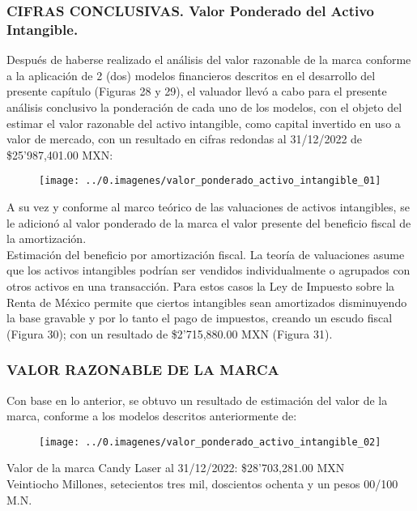 \begin{rightcolumn}

\subsubsection{CIFRAS CONCLUSIVAS. Valor Ponderado del Activo Intangible.}

 Después de haberse realizado el análisis del valor razonable de la marca conforme a la aplicación de 2 (dos) modelos financieros descritos en el desarrollo del presente capítulo (Figuras 28 y 29), el valuador llevó a cabo para el presente análisis conclusivo la ponderación de cada uno de los modelos,  con el objeto del estimar el valor razonable del activo intangible, como capital invertido en uso a valor de mercado,  con un resultado en cifras redondas al 31/12/2022 de \$25'987,401.00 MXN:\\
 
 \begin{figure}[H]
 	\centering
	\texttt{[image: ../0.imagenes/valor\_ponderado\_activo\_intangible\_01]}
 \end{figure}
 
 A su vez y conforme al marco teórico de las valuaciones de activos intangibles, se le adicionó al valor ponderado de la marca el valor presente del beneficio fiscal de la amortización.\\

\textcolor{principal}{Estimación del beneficio por amortización fiscal.} La teoría de valuaciones asume que los activos intangibles podrían ser vendidos individualmente o agrupados con otros activos en una transacción. Para estos casos la Ley de Impuesto sobre la Renta de México permite que ciertos intangibles sean amortizados disminuyendo la base gravable y por lo tanto el pago de impuestos, creando un escudo fiscal  (Figura 30); con un resultado de \$2'715,880.00 MXN (Figura 31).

\subsubsection{VALOR RAZONABLE DE LA MARCA}

Con base en lo anterior, se obtuvo un resultado de estimación del valor de la marca, conforme a los modelos descritos anteriormente de:

 \begin{figure}[H]
 	\centering
	\texttt{[image: ../0.imagenes/valor\_ponderado\_activo\_intangible\_02]}
 \end{figure}
 
 \begin{center}
Valor de la marca Candy Laser \textregistered al 31/12/2022:
\$28'703,281.00 MXN\\

Veintiocho Millones, setecientos tres mil, doscientos ochenta y un pesos 00/100 M.N.
\end{center}



\end{rightcolumn}

\begin{leftcolumn}

\end{leftcolumn}